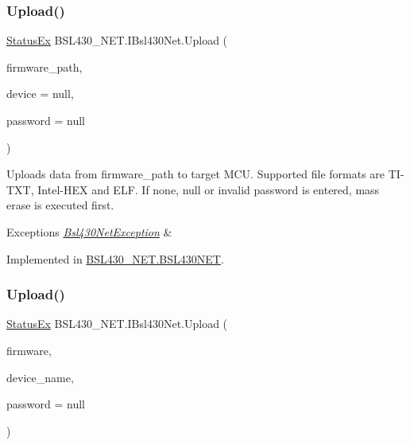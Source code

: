 \mbox{\label{interface_b_s_l430___n_e_t_1_1_i_bsl430_net_a598587fc08c2f9082b08abb65c058eaa}} 
\subsubsection{\texorpdfstring{Upload()}{Upload()}\hspace{0.1cm}{\footnotesize\ttfamily [1/2]}}
{\footnotesize\ttfamily \mbox{\hyperlink{class_b_s_l430___n_e_t_1_1_status_ex}{Status\+Ex}} B\+S\+L430\+\_\+\+N\+E\+T.\+I\+Bsl430\+Net.\+Upload (\begin{DoxyParamCaption}\item[{string}]{firmware\+\_\+path,  }\item[{\mbox{\hyperlink{class_b_s_l430___n_e_t_1_1_bsl430_net_device}{Bsl430\+Net\+Device}}}]{device = {\ttfamily null},  }\item[{byte \mbox{[}$\,$\mbox{]}}]{password = {\ttfamily null} }\end{DoxyParamCaption})}



Uploads data from firmware\+\_\+path to target M\+CU. Supported file formats are T\+I-\/\+T\+XT, Intel-\/\+H\+EX and E\+LF. If none, null or invalid password is entered, mass erase is executed first. 


\begin{DoxyExceptions}{Exceptions}
{\em \mbox{\hyperlink{class_b_s_l430___n_e_t_1_1_bsl430_net_exception}{Bsl430\+Net\+Exception}}} & \\
\hline
\end{DoxyExceptions}


Implemented in \mbox{\hyperlink{class_b_s_l430___n_e_t_1_1_b_s_l430_n_e_t_aaa54534dbbc4b9b255bffe5d6e29ba40}{B\+S\+L430\+\_\+\+N\+E\+T.\+B\+S\+L430\+N\+ET}}.

\mbox{\label{interface_b_s_l430___n_e_t_1_1_i_bsl430_net_a3bc860bea764dd0ad0ee9c7a05fe4ecc}} 
\subsubsection{\texorpdfstring{Upload()}{Upload()}\hspace{0.1cm}{\footnotesize\ttfamily [2/2]}}
{\footnotesize\ttfamily \mbox{\hyperlink{class_b_s_l430___n_e_t_1_1_status_ex}{Status\+Ex}} B\+S\+L430\+\_\+\+N\+E\+T.\+I\+Bsl430\+Net.\+Upload (\begin{DoxyParamCaption}\item[{string}]{firmware,  }\item[{string}]{device\+\_\+name,  }\item[{byte \mbox{[}$\,$\mbox{]}}]{password = {\ttfamily null} }\end{DoxyParamCaption})}



